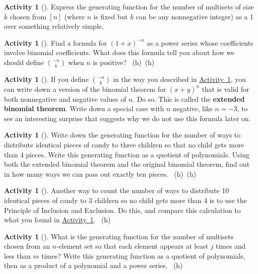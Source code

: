 \documentclass[10pt,]{book}
\newcommand{\terminology}[1]{\textbf{#1}}
\theoremstyle{plain}
\theoremstyle{definition}
\theoremstyle{definition}
\theoremstyle{definition}
\newtheorem{activity}[project]{Activity}
\numberwithin{equation}{chapter}
\begin{document}
\begin{activity}[]\label{multisetgenfn}
\hypertarget{p-1313}{}%
Express the generating function for the number of multisets of size \(k\) chosen from \([n]\) (where \(n\) is fixed but \(k\) can be any nonnegative integer) as a 1 over something relatively simple.%
\end{activity}
\begin{activity}[]\label{negnchoosek}
\hypertarget{p-1316}{}%
Find a formula for \((1+x)^{-n}\) as a power series whose coefficients involve binomial coefficients. What does this formula tell you about how we should define \(\binom{-n}{k}\) when \(n\) is positive?%
~{\tiny (h)}~{\tiny (h)}\end{activity}
\begin{activity}[]\label{activity-247}
\hypertarget{p-1320}{}%
If you define \(\binom{-n}{k}\) in the way you described in \hyperref[negnchoosek]{Activity~\ref{negnchoosek}}, you can write down a version of the binomial theorem for \((x+y)^n\) that is valid for both nonnegative and negative values of \(n\). Do so. This is called the \terminology{extended binomial theorem}. Write down a special case with \(n\) negative, like \(n=-3\), to see an interesting surprise that suggests why we do not use this formula later on.%
\end{activity}
\begin{activity}[]\label{candygenfn}
\hypertarget{p-1322}{}%
Write down the generating function for the number of ways to distribute identical pieces of candy to three children so that no child gets more than 4 pieces. Write this generating function as a quotient of polynomials. Using both the extended binomial theorem and the original binomial theorem, find out in how many ways we can pass out exactly ten pieces.%
~{\tiny (h)}~{\tiny (h)}\end{activity}
\begin{activity}[]\label{activity-249}
\hypertarget{p-1327}{}%
Another way to count the number of ways to distribute 10 identical pieces of candy to 3 children so no child gets more than 4 is to use the Principle of Inclusion and Exclusion.  Do this, and compare this calculation to what you found in \hyperref[candygenfn]{Activity~\ref{candygenfn}}.%
~{\tiny (h)}\end{activity}
\begin{activity}[]\label{activity-250}
\hypertarget{p-1329}{}%
What is the generating function for the number of multisets chosen from an \(n\)-element set so that each element appears at least \(j\) times and less than \(m\) times? Write this generating function as a quotient of polynomials, then as a product of a polynomial and a power series.%
~{\tiny (h)}\end{activity}
\typeout{************************************************}
\typeout{************************************************}
\end{document}
